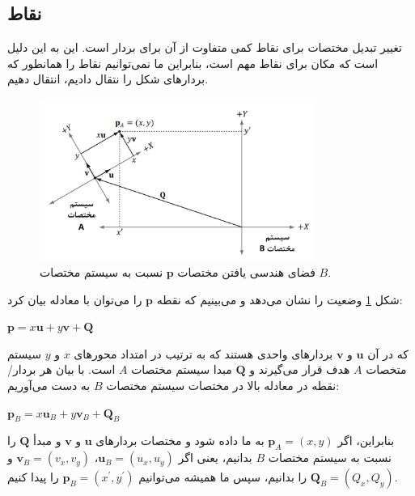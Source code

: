 \subsection{\textbf{نقاط}}
\label{subsec:3.4.2}
{
    \Large
    \begin{spacing}{1.4}
        تغییر تبدیل مختصات برای نقاط کمی متفاوت از آن برای بردار است.
        این به این دلیل است که مکان برای نقاط مهم است، بنابراین ما نمی‌توانیم نقاط را همانطور که بردارهای شکل \label{fig:4.Session.1.3.11} را نتقال دادیم، انتقال دهیم.
        \begin{figure}[H]
            \centering
            \setlength{\belowcaptionskip}{-10pt}
            \includegraphics[width=0.8\textwidth]{Images/4/3/4.Session.1.3.12}
            \caption {فضای هندسی یافتن مختصات $\textbf{p}$ نسبت به سیستم مختصات $B$.}
            \label{fig:4.Session.1.3.12}
        \end{figure}
        شکل \ref{fig:4.Session.1.3.12} وضعیت را نشان می‌دهد و می‌بینیم که نقطه $\textbf{p}$ را می‌توان با معادله بیان کرد:

        \begin{center}
            $\textbf{p}=x\textbf{u}+y\textbf{v}+\textbf{Q}$
        \end{center}

        که در آن $\textbf{u}$ و $\textbf{v}$ بردارهای واحدی هستند که به ترتیب در امتداد محورهای $x$ و $y$ سیستم متخصات $A$ هدف قرار می‌گیرند و $\textbf{Q}$ مبدا سیستم مختصات $A$ است.
        با بیان هر بردار/نقطه در معادله بالا در مختصات سیستم مختصات $B$ به دست می‌آوریم:

        \begin{center}
            $\textbf{p}_{B}=x\textbf{u}_{B}+y\textbf{v}_{B}+\textbf{Q}_{B}$
        \end{center}

        بنابراین، اگر $\textbf{p}_{A}=(x, y)$ به ما داده شود و مختصات بردارهای $\textbf{u}$ و $\textbf{v}$ و مبدأ $\textbf{Q}$ را نسبت به سیستم مختصات $B$ بدانیم، یعنی اگر $\textbf{u}_{B}=(u_{x}, u_{y})$، $\textbf{v}_{B}=(v_{x}, v_{y})$ و $\textbf{Q}_{B}=(Q_{x}, Q_{y})$ را بدانیم، سپس ما همیشه می‌توانیم $\textbf{p}_{B}=(x^\prime, y^\prime)$ را پیدا کنیم.


\end{spacing}}
